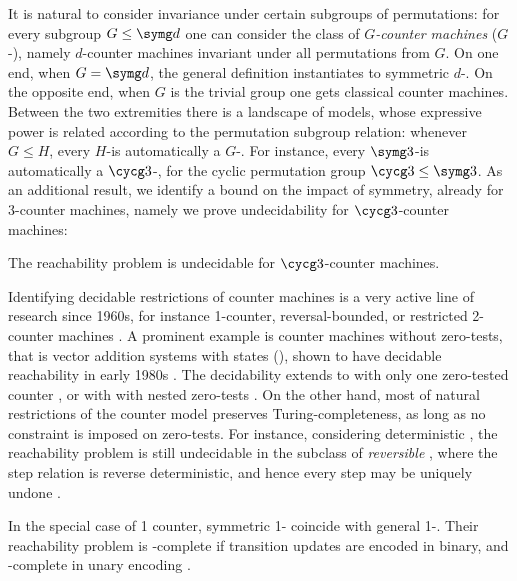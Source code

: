 \medskip

It is natural to consider invariance under certain subgroups
of permutations: for every subgroup $G\leq \symg d$
one can consider the class of \emph{$G$-counter machines}
($G$-), namely 
$d$-counter machines invariant under all permutations from $G$.
On one end, 
when $G=\symg d$, the general definition instantiates to 
symmetric $d$-.
On the opposite end, when $G$ is the trivial group one gets classical counter
machines.
Between the two extremities there is a landscape of models, 
whose expressive power is related according to the permutation subgroup relation:
whenever $G\leq H$, every $H$-\cm is automatically a
$G$-\cm.
For instance, every $\symg 3$-\cm is automatically
a $\cycg 3$-\cm, for the cyclic 
permutation group $\cycg 3 \leq \symg 3$.
As an additional result, we identify a bound on the impact of symmetry,
already for 3-counter machines, namely we prove undecidability 
for $\cycg 3$-counter machines:

\begin{theorem} \label{thm:undecid}
The reachability problem  is undecidable for $\cycg 3$-counter machines.
\end{theorem}



Identifying decidable restrictions of counter machines
is a very active line of research since 1960s, for instance 
1-counter, reversal-bounded, or restricted 2-counter machines 
\cite{HKOW09,Ibarra78,FS00}.
A prominent example is counter machines without zero-tests, that is
vector addition systems with states
(\vass), shown to have decidable reachability in early 1980s
\cite{Mayr81,Kosaraju82,Lambert92}.
The decidability extends to 
with only one zero-tested counter \cite{Bonnet11},
or with with nested zero-tests \cite{Reinhardt08,GCL25}.
On the other hand, most of natural restrictions of the counter model
preserves Turing-completeness, as long as no constraint is imposed
on zero-tests.
For instance, considering deterministic , 
the reachability problem is still undecidable
in the subclass of \emph{reversible} ,
where the step relation is reverse deterministic, and hence every step
may be uniquely undone \cite{Morita96}.

In the special case of 1 counter, symmetric 1- coincide with 
general 1-.
Their reachability problem is \np-complete 
if transition updates are encoded in binary, and \nl-complete 
in unary encoding \cite{HKOW09}.

